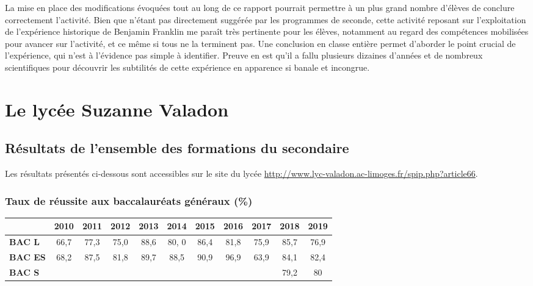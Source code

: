 \documentclass[12pt,a4paper, fleqn]{report}
\begin{document}
La mise en place des modifications évoquées tout au long de ce rapport pourrait permettre à un plus grand nombre d'élèves de conclure correctement l'activité.
Bien que n'étant pas directement suggérée par les programmes de seconde, cette activité reposant sur l'exploitation de l'expérience historique de Benjamin Franklin me paraît très pertinente pour les élèves, notamment au regard des compétences mobilisées pour avancer sur l'activité, et ce même si tous ne la terminent pas.
Une conclusion en classe entière permet d'aborder le point crucial de l'expérience, qui n'est à l'évidence pas simple à identifier.
Preuve en est qu'il a fallu plusieurs dizaines d'années et de nombreux scientifiques pour découvrir les subtilités de cette expérience en apparence si banale et incongrue.

\newpage


\newpage
\appendix

\chapter{Le lycée Suzanne Valadon}

\section{Résultats de l'ensemble des formations du secondaire}
\label{ann:resultats}

Les résultats présentés ci-dessous sont accessibles sur le site du lycée \href{http://www.lyc-valadon.ac-limoges.fr/spip.php?article66}{http://www.lyc-valadon.ac-limoges.fr/spip.php?article66}.

\subsection{Taux de réussite aux baccalauréats généraux (\%)}

\begin{center}
\begin{tabular}{l|c|c|c|c|c|c|c|c|c|c}
		& \textbf{2010} & \textbf{2011} & \textbf{2012} & \textbf{2013} & \textbf{2014} & \textbf{2015} & \textbf{2016} & \textbf{2017} & \textbf{2018} & \textbf{2019} \\
\hline \hline
\textbf{BAC L} 		& 66{,}7 & 77{,}3 & 75{,}0 & 88{,}6 & 80{,} 0 & 86{,}4 & 81{,}8 & 75{,}9 & 85{,}7 & 76{,}9 \\
\hline
\textbf{BAC ES} 	& 68{,}2 & 87{,}5 & 81{,}8 & 89{,}7 & 88{,}5 & 90{,}9 & 96{,}9 & 63{,}9 & 84{,}1 & 82{,}4 \\
\hline
\textbf{BAC S}		& & & & & & & & & 79{,}2 & 80 \\
\end{tabular}
\end{center}
\end{document}
